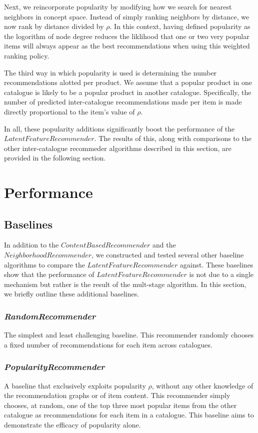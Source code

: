 \documentclass[11pt]{article}
\begin{document}
Next, we reincorporate popularity by modifying how we search for nearest
neighbors in concept space. Instead of simply ranking neighbors by distance, we
now rank by distance divided by $\rho$.  In this context, having defined
popularity as the logorithm of node degree reduces the liklihood that one or two
very popular items will always appear as the best recommendations when using
this weighted ranking policy. 

The third way in which popularity is used is determining the number
recommendations alotted per product. We assume that a popular product in one
catalogue is likely to be a popular product in another catalogue. Specifically,
the number of predicted inter-catalogue recommendations made per item is
made directly proportional to the item's value of $\rho$.

In all, these popularity additions significantly boost the performance of the
\linebreak $LatentFeatureRecommender$. The results of this, along with
comparisons to the other inter-catalogue  recommeder algorithms described in
this section, are provided in the following section.

\section*{Performance}
\subsection*{Baselines}
In addition to the $ContentBasedRecommender$ and the $NeighborhoodRecommender$,
we constructed and tested several other baseline algorithms to compare the
$LatentFeatureRecommender$ against. These baselines show that the performance of
$LatentFeatureRecommender$ is not due to a single mechanism but rather is the
result of the mult-stage algorithm. In this section, we briefly outline these
additional baselines.

\subsubsection*{\em RandomRecommender}
The simplest and least challenging baseline. This recommender randomly chooses a
fixed number of recommendations for each item across catalogues.

\subsubsection*{\em PopularityRecommender}
A baseline that exclusively exploits popularity $\rho$, without any other
knowledge of the recommendation graphs or of item content. This recommender
simply chooses, at random, one of the top three most popular items from the
other catalogue as recommendations for each item in a catalogue. This baseline
aims to demonstrate the efficacy of popularity alone.
\end{document}
